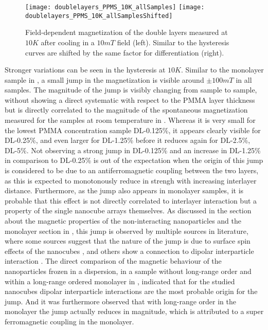 \documentclass[\main/dresen_thesis.tex]{subfiles}
\begin{document}

    \begin{figure}[tb]
      \centering
      \texttt{[image: doublelayers\_PPMS\_10K\_allSamples]}
      \texttt{[image: doublelayers\_PPMS\_10K\_allSamplesShifted]}
      \caption{\label{fig:doubleLayers:10KVSM}Field-dependent magnetization of the double layers measured at $10 \unit{K}$ after cooling in a $10 \unit{mT}$ field (left). Similar to  the hysteresis curves are shifted by the same factor for differentiation (right).}
    \end{figure}
    Stronger variations can be seen in the hysteresis at $10 \unit{K}$.
    Similar to the monolayer sample in , a small jump in the magnetization is visible around $\pm 100 \unit{mT}$ in all samples.
    The magnitude of the jump is visibly changing from sample to sample, without showing a direct systematic with respect to the PMMA layer thickness but is directly correlated to the magnitude of the spontaneous magnetization measured for the samples at room temperature in .
    Whereas it is very small for the lowest PMMA concentration sample DL-0.125\%, it appears clearly visible for DL-0.25\%, and even larger for DL-1.25\% before it reduces again for DL-2.5\%, DL-5\%.
    Not observing a strong jump in DL-0.125\% and an increase in DL-1.25\% in comparison to DL-0.25\% is out of the expectation when the origin of this jump is considered to be due to an antiferromagnetic coupling between the two layers, as this is expected to monotonously reduce in strengh with increasing interlayer distance.
    Furthermore, as the jump also appears in monolayer samples, it is probable that this effect is not directly correlated to interlayer interaction but a property of the single nanocube arrays themselves.
    As discussed in the section about the magnetic properties of the non-interacting nanoparticles  and the monolayer section in , this jump is observed by multiple sources in literature, where some sources suggest that the nature of the jump is due to surface spin effects of the nanocubes \cite{Xu_2015_Simul, Fu_2012_Uniqu}, and others show a connection to dipolar interparticle interaction \cite{Alves_2017_Waspw, Sathya_2016_Cofeo}.
    The direct comparison of the magnetic behaviour of the nanoparticles frozen in a dispersion, in a sample without long-range order and within a long-range ordered monolayer in , indicated that for the studied nanocubes dipolar interparticle interactions are the most probable origin for the jump.
    And it was furthermore observed that with long-range order in the monolayer the jump actually reduces in magnitude, which is attributed to a super ferromagnetic coupling in the monolayer.
\end{document}
